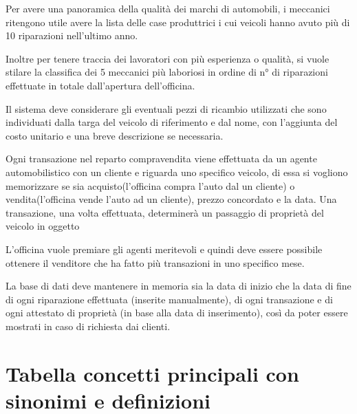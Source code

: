\documentclass[a4paper,12pt]{report}
\begin{document}
Per avere una panoramica della qualità dei marchi di automobili, i meccanici ritengono utile avere la lista delle 
%
case produttrici i cui veicoli hanno avuto più di 10 riparazioni nell'ultimo anno.

Inoltre per tenere traccia dei lavoratori con più esperienza o qualità, si vuole stilare la classifica dei 5 meccanici
%
più laboriosi in ordine di n° di riparazioni effettuate in totale dall'apertura dell'officina.

Il sistema deve considerare gli eventuali pezzi di ricambio utilizzati che sono individuati dalla targa del veicolo di
%
riferimento e dal nome, con l'aggiunta del costo unitario e una breve descrizione se necessaria.

Ogni transazione nel reparto compravendita viene effettuata da un agente automobilistico con un cliente 
%
e riguarda uno specifico veicolo, di essa si vogliono memorizzare se sia acquisto(l'officina compra l'auto 
%
dal un cliente) o vendita(l'officina vende l'auto ad un cliente), prezzo concordato e la data. 
% 
Una transazione, una volta effettuata, determinerà un passaggio di proprietà del veicolo in oggetto

L'officina vuole premiare gli agenti meritevoli e quindi deve essere possibile ottenere il venditore che ha fatto
%
più transazioni in uno specifico mese. 

La base di dati deve mantenere in memoria sia la data di inizio che la data di fine di ogni riparazione effettuata
% 
(inserite manualmente), di ogni transazione e di ogni attestato di proprietà (in base alla data di inserimento),
%
così da poter essere mostrati in caso di richiesta dai clienti.

\section{Tabella concetti principali con sinonimi e definizioni}
\end{document}
